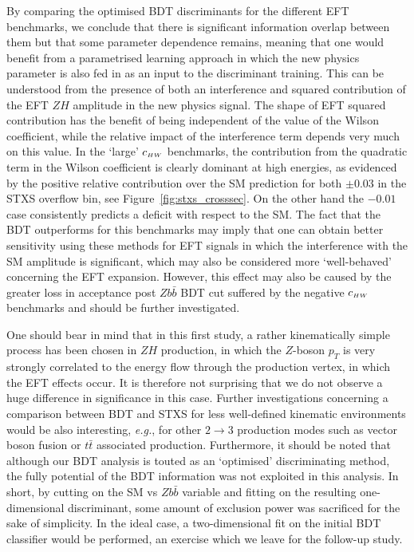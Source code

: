 By comparing the optimised BDT discriminants for the different EFT benchmarks, we conclude that there is significant information overlap between them but that some parameter dependence remains, meaning that one would benefit from a parametrised learning approach in which the new physics parameter is also fed in as an input to the discriminant training. This can be understood from the presence of both an interference and squared contribution of the EFT $ZH$ amplitude in the new physics signal. The shape of EFT squared contribution has the benefit of being independent of the value of the Wilson coefficient, while the relative impact of the interference term depends very much on this value. In the `large' $c_{\scriptscriptstyle HW}$ benchmarks, the contribution from the quadratic term in the Wilson coefficient is clearly dominant at high energies, as evidenced by the positive relative contribution over the SM prediction for both $\pm0.03$ in the STXS overflow bin, see Figure~\ref{fig:stxs_crosssec}. On the other hand the $-0.01$ case consistently predicts a deficit with respect to the SM. The fact that the BDT outperforms for this benchmarks may imply that one can obtain better sensitivity using these methods for EFT signals in which the interference with the SM amplitude is significant, which may also be considered more `well-behaved' concerning the EFT expansion. However, this effect may also be caused by the greater loss in acceptance post $Zb\bar{b}$ BDT cut suffered by the negative $c_{\scriptscriptstyle HW}$ benchmarks and should be further investigated.

One should bear in mind that in this first study, a rather kinematically simple process has been chosen in $ZH$ production, in which the $Z$-boson $p_T$ is very strongly correlated to the energy flow through the production vertex, in which the EFT effects occur. It is therefore not surprising that we do not observe a huge difference in significance in this case. Further investigations concerning a comparison between BDT and STXS for less well-defined kinematic environments would be also interesting, \emph{e.g.}, for other $2\to3$ production modes such as vector boson fusion or $t\bar{t}$ associated production.  Furthermore, it should be noted that although our BDT analysis is touted as an `optimised' discriminating method, the fully potential of the BDT information was not exploited in this analysis. In short, by cutting on the SM vs $Zb\bar{b}$ variable and fitting on the resulting one-dimensional discriminant, some amount of exclusion power was sacrificed for the sake of simplicity. In the ideal case, a two-dimensional fit on the initial BDT classifier would be performed, an exercise which we leave for the follow-up study.

